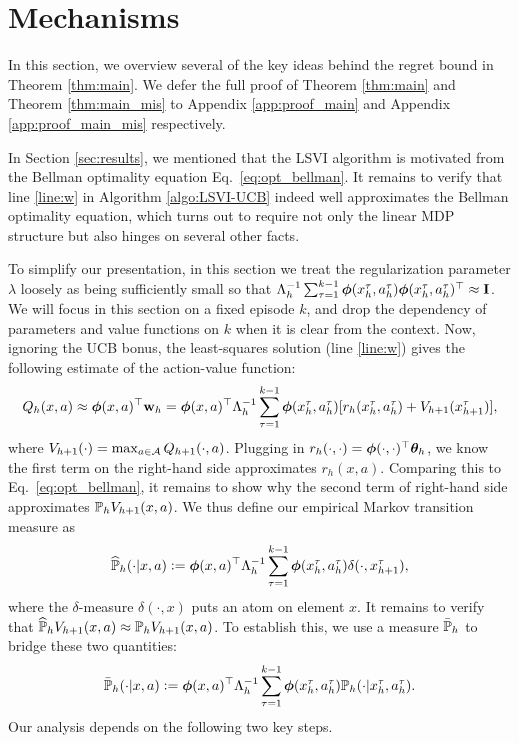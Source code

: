 

\section{Mechanisms}

In this section, we overview several of the key ideas behind the regret bound in Theorem \ref{thm:main}. We defer the full proof of Theorem \ref{thm:main} and Theorem \ref{thm:main_mis} to Appendix \ref{app:proof_main} and Appendix \ref{app:proof_main_mis} respectively.

In Section \ref{sec:results}, we mentioned that the LSVI algorithm is motivated from the Bellman optimality equation Eq.~\eqref{eq:opt_bellman}. It remains to verify that line \ref{line:w} in Algorithm \ref{algo:LSVI-UCB} indeed well approximates the Bellman optimality equation, 
which turns out to require not only the linear MDP structure but also hinges on several other facts. 

To simplify our presentation, in this section we treat the regularization parameter $\lambda$ loosely as being sufficiently small so that $\Lambda_h^{-1} \sum_{\tau =1}^{k-1}  \bphi(x^{\tau}_h,  a^{\tau}_h)\bphi(x^{\tau}_h, a^{\tau}_h)\trans \approx \I$. We will focus in this section on a fixed episode $k$, and drop the dependency of parameters and value functions on $k$ when it is clear from the context. Now, ignoring the UCB bonus, the least-squares solution (line \ref{line:w}) gives the following estimate of the action-value function:
\begin{equation*}
Q_h(x, a) \approx \bphi(x, a)\trans \w_h = \bphi(x, a)\trans\Lambda_h^{-1} \sum_{\tau=1}^{k-1} \bphi(x^{\tau}_h,  a^{\tau}_h) [r_h(x^{\tau}_h, a^{\tau}_h) +  V_{h+1}(x^{\tau}_{h+1})],
\end{equation*}
where $V_{h+1}(\cdot) = \max_{a\in\cA} Q_{h+1}(\cdot, a)$. Plugging in $r_h(\cdot, \cdot) = \bphi(\cdot, \cdot)\trans \btheta_h$, we know the first term on the right-hand side approximates $r_h(x, a)$. Comparing this to Eq.~\eqref{eq:opt_bellman}, it remains to show why the second term of right-hand side approximates $\P_h V_{h+1}(x, a)$. We thus define our empirical Markov transition measure as
\begin{equation*}
\hat{\P}_h (\cdot | x, a) \defeq \bphi(x, a)\trans\Lambda_h^{-1} \sum_{\tau=1}^{k-1} \bphi(x^{\tau}_h,  a^{\tau}_h) \delta(\cdot, x^{\tau}_{h+1}),
\end{equation*}
where the $\delta$-measure $\delta(\cdot, x)$ puts an atom on element $x$. It remains to verify that $\hat{\P}_h V_{h+1}(x, a) \approx \P_h V_{h+1}(x, a)$.
To establish this, we use a measure $\bar{\P}_h$ to bridge these two quantities: 
\begin{equation} \label{eq:P_bar}
\bar{\P}_h (\cdot | x, a) \defeq \bphi(x, a)\trans\Lambda_h^{-1} \sum_{\tau=1}^{k-1} \bphi(x^{\tau}_h,  a^{\tau}_h) \P_h(\cdot | x^{\tau}_h,  a^{\tau}_h).
\end{equation}
Our analysis depends on the following two key steps.

